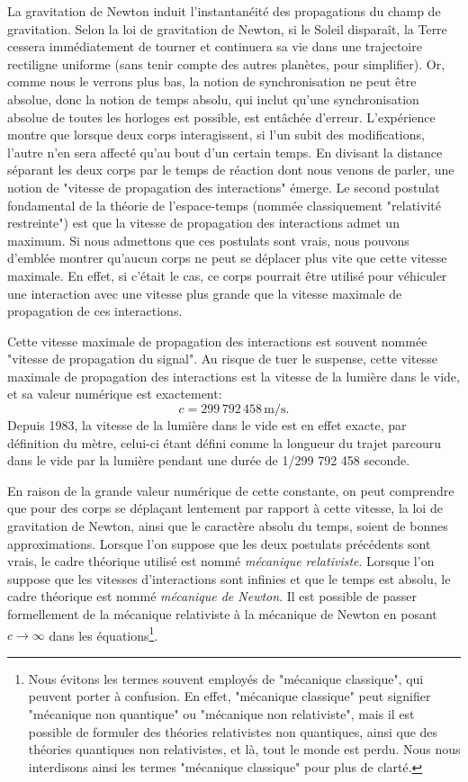 		La gravitation de Newton induit l'instantanéité des propagations du champ de gravitation. Selon la loi de gravitation de Newton, si le Soleil disparaît, la Terre cessera immédiatement de tourner et continuera sa vie dans une trajectoire rectiligne uniforme (sans tenir compte des autres planètes, pour simplifier). Or, comme nous le verrons plus bas, la notion de synchronisation ne peut être absolue, donc la notion de temps absolu, qui inclut qu'une synchronisation absolue de toutes les horloges est possible, est entâchée d'erreur. L'expérience montre que lorsque deux corps interagissent, si l'un subit des modifications, l'autre n'en sera affecté qu'au bout d'un certain temps. En divisant la distance séparant les deux corps par le temps de réaction dont nous venons de parler, une notion de "vitesse de propagation des interactions" émerge. Le second postulat fondamental de la théorie de l'espace-temps (nommée classiquement "relativité restreinte") est que la vitesse de propagation des interactions admet un maximum. Si nous admettons que ces postulats sont vrais, nous pouvons d'emblée montrer qu'aucun corps ne peut se déplacer plus vite que cette vitesse maximale. En effet, si c'était le cas, ce corps pourrait être utilisé pour véhiculer une interaction avec une vitesse plus grande que la vitesse maximale de propagation de ces interactions. 

		Cette vitesse maximale de propagation des interactions est souvent nommée "vitesse de propagation du signal". Au risque de tuer le suspense, cette vitesse maximale de propagation des interactions est la vitesse de la lumière dans le vide, et sa valeur numérique est exactement:
		\begin{equation}
			c=299\, 792\, 458\, \mathrm{m}/\mathrm{s}.
		\end{equation}
		Depuis 1983, la vitesse de la lumière dans le vide est en effet exacte, par définition du mètre, celui-ci étant défini comme la longueur du trajet parcouru dans le vide par la lumière pendant une durée de 1/299 792 458 seconde. 

		En raison de la grande valeur numérique de cette constante, on peut comprendre que pour des corps se déplaçant lentement par rapport à cette vitesse, la loi de gravitation de Newton, ainsi que le caractère absolu du temps, soient de bonnes approximations. Lorsque l'on suppose que les deux postulats précédents sont vrais, le cadre théorique utilisé est nommé \emph{mécanique relativiste}. Lorsque l'on suppose que les vitesses d'interactions sont infinies et que le temps est absolu, le cadre théorique est nommé \emph{mécanique de Newton}. Il est possible de passer formellement de la mécanique relativiste à la mécanique de Newton en posant $c\rightarrow\infty$ dans les équations\footnote{Nous évitons les termes souvent employés de "mécanique classique", qui peuvent porter à confusion. En effet, "mécanique classique" peut signifier "mécanique non quantique" ou "mécanique non relativiste", mais il est possible de formuler des théories relativistes non quantiques, ainsi que des théories quantiques non relativistes, et là, tout le monde est perdu. Nous nous interdisons ainsi les termes "mécanique classique" pour plus de clarté.}. 

